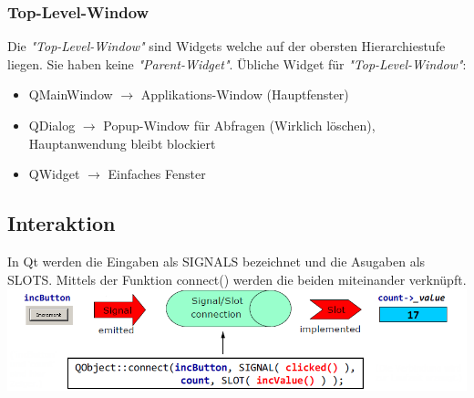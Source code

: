 \subsubsection{Top-Level-Window}
Die \textit{"Top-Level-Window"} sind Widgets welche auf der obersten Hierarchiestufe liegen. Sie haben keine \textit{"Parent-Widget"}.
Übliche Widget für \textit{"Top-Level-Window"}: 
\begin{itemize}
	\item QMainWindow $\rightarrow$ Applikations-Window (Hauptfenster)
	\item QDialog $\rightarrow$ Popup-Window für Abfragen (Wirklich löschen), Hauptanwendung bleibt blockiert
	\item QWidget $\rightarrow$ Einfaches Fenster
\end{itemize}

\subsection{Interaktion}
In Qt werden die Eingaben als SIGNALS bezeichnet und die Asugaben als SLOTS. Mittels der Funktion connect() werden die beiden miteinander verknüpft.\\
\includegraphics[width=15cm]{images/connect.png}

